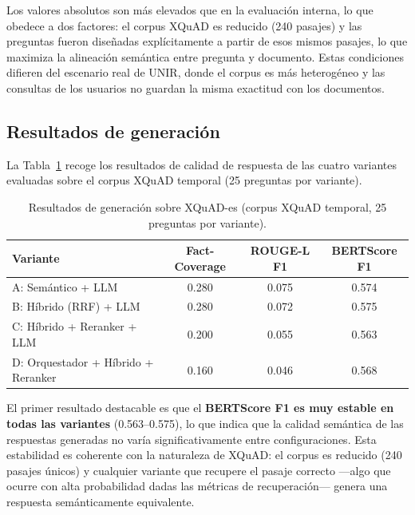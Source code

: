 Los valores absolutos son más elevados que en la evaluación interna, lo que obedece a dos factores: el corpus XQuAD es reducido (240 pasajes) y las preguntas fueron diseñadas explícitamente a partir de esos mismos pasajes, lo que maximiza la alineación semántica entre pregunta y documento. 
Estas condiciones difieren del escenario real de UNIR, donde el corpus es más heterogéneo y las consultas de los usuarios no guardan la misma exactitud con los documentos.

\subsection{Resultados de generación}\label{subsec:xquad-resultados-generacion}

La Tabla~\ref{tab:xquad-generation} recoge los resultados de calidad de respuesta de las cuatro variantes evaluadas sobre el corpus XQuAD temporal (25 preguntas por variante).

\begin{table}[H]
\centering
\begin{tabular}{lccc}
\toprule
\textbf{Variante} & \textbf{Fact-Coverage} & \textbf{ROUGE-L F1} & \textbf{BERTScore F1} \\
\midrule
A: Semántico + LLM                  & 0.280 & 0.075 & 0.574 \\
B: Híbrido (RRF) + LLM              & 0.280 & 0.072 & 0.575 \\
C: Híbrido + Reranker + LLM         & 0.200 & 0.055 & 0.563 \\
D: Orquestador + Híbrido + Reranker & 0.160 & 0.046 & 0.568 \\
\bottomrule
\end{tabular}
\caption{Resultados de generación sobre XQuAD-es (corpus XQuAD temporal, 25 preguntas por variante).}
\label{tab:xquad-generation}
\end{table}

El primer resultado destacable es que el \textbf{BERTScore F1 es muy estable en todas las variantes} (0.563–0.575), lo que indica que la calidad semántica de las respuestas generadas no varía significativamente entre configuraciones. 
Esta estabilidad es coherente con la naturaleza de XQuAD: el corpus es reducido (240 pasajes únicos) y cualquier variante que recupere el pasaje correcto —algo que ocurre con alta probabilidad dadas las métricas de recuperación— genera una respuesta semánticamente equivalente.

